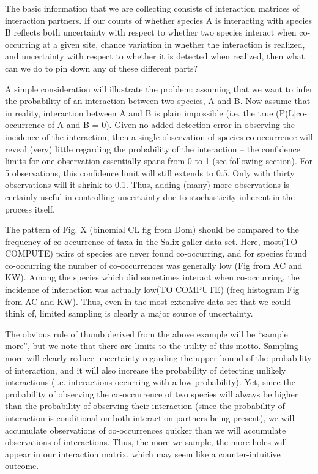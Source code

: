 \documentclass[12pt]{article}
\begin{document}
The basic information that we are collecting consists of interaction matrices of interaction partners. If our counts of whether species A is interacting with species B reflects both uncertainty with respect to whether two species interact when co-occurring at a given site, chance variation in whether the interaction is realized, and uncertainty with respect to whether it is detected when realized, then what can we do to pin down any of these different parts?

A simple consideration will illustrate the problem: assuming that we want to infer the probability of an interaction between two species, A and B. Now assume that in reality, interaction between A and B is plain impossible (i.e. the true (P(L|co-occurrence of A and B = 0). Given no added detection error in observing the incidence of the interaction, then a single observation of species co-occurrence will reveal (very) little regarding the probability of the interaction – the confidence limits for one observation essentially spans from 0 to 1 (see following section). For 5 observations, this confidence limit will still extends to 0.5. Only with thirty observations will it shrink to 0.1. Thus, adding (many) more observations is certainly useful in controlling uncertainty due to stochasticity inherent in the process itself.

The pattern of Fig. X (binomial CL fig from Dom) should be compared to the frequency of co-occurrence of taxa in the Salix-galler data set. Here, most(TO COMPUTE) pairs of species are never found co-occurring, and for species found co-occurring the number of co-occurrences was generally low (Fig from AC and KW). Among the species which did sometimes interact when co-occurring, the incidence of interaction was actually low(TO COMPUTE) (freq histogram Fig from AC and KW). Thus, even in the most extensive data set that we could think of, limited sampling is clearly a major source of uncertainty.

The obvious rule of thumb derived from the above example will be “sample more”, but we note that there are limits to the utility of this motto. Sampling more will clearly reduce uncertainty regarding the upper bound of the probability of interaction, and it will also increase the probability of detecting unlikely interactions (i.e. interactions occurring with a low probability). Yet, since the probability of observing the co-occurrence of two species will always be higher than the probability of observing their interaction (since the probability of interaction is conditional on both interaction partners being present), we will accumulate observations of co-occurrences quicker than we will accumulate observations of interactions. Thus, the more we sample, the more holes will appear in our interaction matrix, which may seem like a counter-intuitive outcome.
\end{document}
